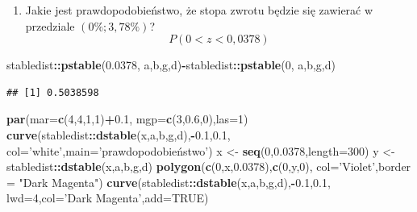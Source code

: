 \documentclass[polish,]{book}
\newenvironment{Shaded}{\begin{snugshade}}{\end{snugshade}}
\newcommand{\DataTypeTok}[1]{\textcolor[rgb]{0.13,0.29,0.53}{#1}}
\newcommand{\DecValTok}[1]{\textcolor[rgb]{0.00,0.00,0.81}{#1}}
\newcommand{\FloatTok}[1]{\textcolor[rgb]{0.00,0.00,0.81}{#1}}
\newcommand{\KeywordTok}[1]{\textcolor[rgb]{0.13,0.29,0.53}{\textbf{#1}}}
\newcommand{\NormalTok}[1]{#1}
\newcommand{\OperatorTok}[1]{\textcolor[rgb]{0.81,0.36,0.00}{\textbf{#1}}}
\newcommand{\OtherTok}[1]{\textcolor[rgb]{0.56,0.35,0.01}{#1}}
\newcommand{\StringTok}[1]{\textcolor[rgb]{0.31,0.60,0.02}{#1}}
\providecommand{\tightlist}{%
  \setlength{\itemsep}{0pt}\setlength{\parskip}{0pt}}
\begin{document}
\begin{enumerate}
\def\labelenumi{\arabic{enumi}.}
\setcounter{enumi}{2}
\tightlist
\item
  Jakie jest prawdopodobieństwo, że stopa zwrotu będzie się zawierać w przedziale
  \((0\%; 3,78\%)\)?
  \[P(0<z<0,0378)\]
\end{enumerate}

\begin{Shaded}
\begin{Highlighting}[]
\NormalTok{stabledist}\OperatorTok{::}\KeywordTok{pstable}\NormalTok{(}\FloatTok{0.0378}\NormalTok{, a,b,g,d)}\OperatorTok{-}\NormalTok{stabledist}\OperatorTok{::}\KeywordTok{pstable}\NormalTok{(}\DecValTok{0}\NormalTok{, a,b,g,d)}
\end{Highlighting}
\end{Shaded}

\begin{verbatim}
## [1] 0.5038598
\end{verbatim}

\begin{Shaded}
\begin{Highlighting}[]
\KeywordTok{par}\NormalTok{(}\DataTypeTok{mar=}\KeywordTok{c}\NormalTok{(}\DecValTok{4}\NormalTok{,}\DecValTok{4}\NormalTok{,}\DecValTok{1}\NormalTok{,}\DecValTok{1}\NormalTok{)}\OperatorTok{+}\FloatTok{0.1}\NormalTok{, }\DataTypeTok{mgp=}\KeywordTok{c}\NormalTok{(}\DecValTok{3}\NormalTok{,}\FloatTok{0.6}\NormalTok{,}\DecValTok{0}\NormalTok{),}\DataTypeTok{las=}\DecValTok{1}\NormalTok{)}
\KeywordTok{curve}\NormalTok{(stabledist}\OperatorTok{::}\KeywordTok{dstable}\NormalTok{(x,a,b,g,d),}\OperatorTok{-}\FloatTok{0.1}\NormalTok{,}\FloatTok{0.1}\NormalTok{,}
      \DataTypeTok{col=}\StringTok{'white'}\NormalTok{,}\DataTypeTok{main=}\StringTok{'prawdopodobieństwo'}\NormalTok{)}
\NormalTok{x <-}\StringTok{ }\KeywordTok{seq}\NormalTok{(}\DecValTok{0}\NormalTok{,}\FloatTok{0.0378}\NormalTok{,}\DataTypeTok{length=}\DecValTok{300}\NormalTok{)}
\NormalTok{y <-}\StringTok{ }\NormalTok{stabledist}\OperatorTok{::}\KeywordTok{dstable}\NormalTok{(x,a,b,g,d)}
\KeywordTok{polygon}\NormalTok{(}\KeywordTok{c}\NormalTok{(}\DecValTok{0}\NormalTok{,x,}\FloatTok{0.0378}\NormalTok{),}\KeywordTok{c}\NormalTok{(}\DecValTok{0}\NormalTok{,y,}\DecValTok{0}\NormalTok{),}
        \DataTypeTok{col=}\StringTok{'Violet'}\NormalTok{,}\DataTypeTok{border =} \StringTok{"Dark Magenta"}\NormalTok{)}
\KeywordTok{curve}\NormalTok{(stabledist}\OperatorTok{::}\KeywordTok{dstable}\NormalTok{(x,a,b,g,d),}\OperatorTok{-}\FloatTok{0.1}\NormalTok{,}\FloatTok{0.1}\NormalTok{,}
      \DataTypeTok{lwd=}\DecValTok{4}\NormalTok{,}\DataTypeTok{col=}\StringTok{'Dark Magenta'}\NormalTok{,}\DataTypeTok{add=}\OtherTok{TRUE}\NormalTok{)}
\end{Highlighting}
\end{Shaded}
\end{document}
